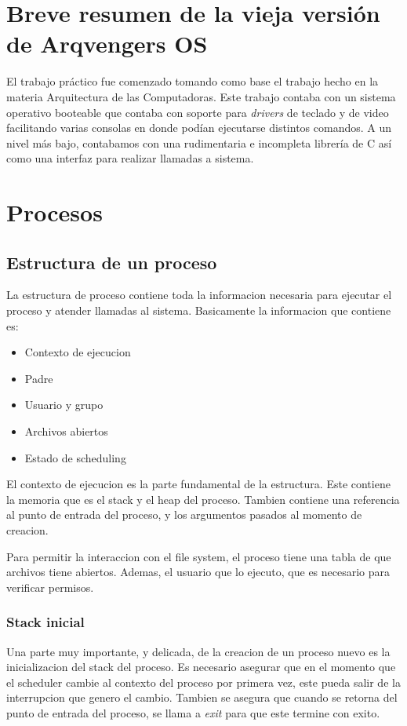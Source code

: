 \documentclass[a4paper,10pt]{article}
\begin{document}
\newpage
\section{Breve resumen de la vieja versión de Arqvengers OS}
El trabajo práctico fue comenzado tomando como base el trabajo hecho en la materia Arquitectura de las Computadoras.
 Este trabajo contaba con un sistema operativo booteable que contaba con soporte para \textit{drivers} de
  teclado y de video facilitando varias consolas en donde podían ejecutarse distintos comandos. 
  A un nivel más bajo, contabamos con una rudimentaria e incompleta librería de C así como una interfaz para realizar
  llamadas a sistema.
\newpage
\section{Procesos}

\subsection{Estructura de un proceso}
La estructura de proceso contiene toda la informacion necesaria para ejecutar el proceso y atender llamadas al sistema.
Basicamente la informacion que contiene es:
\begin{itemize}
\item Contexto de ejecucion
\item Padre
\item Usuario y grupo
\item Archivos abiertos
\item Estado de scheduling
\end{itemize}

El contexto de ejecucion es la parte fundamental de la estructura.
Este contiene la memoria que es el stack y el heap del proceso.
Tambien contiene una referencia al punto de entrada del proceso, y los argumentos pasados al momento de creacion.

Para permitir la interaccion con el file system, el proceso tiene una tabla de que archivos tiene abiertos.
Ademas, el usuario que lo ejecuto, que es necesario para verificar permisos.

\subsubsection{Stack inicial}
Una parte muy importante, y delicada, de la creacion de un proceso nuevo es la inicializacion del stack del proceso.
Es necesario asegurar que en el momento que el scheduler cambie al contexto del proceso por primera vez, este pueda salir de la interrupcion que genero el cambio.
Tambien se asegura que cuando se retorna del punto de entrada del proceso, se llama a \textit{exit} para que este termine con exito.
\end{document}
